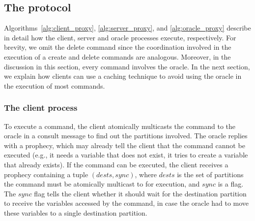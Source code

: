 \subsection{The \dynastar protocol}

Algorithms~\ref{alg:client_proxy}, \ref{alg:server_proxy}, and \ref{alg:oracle_proxy} describe in detail how the client, server and oracle processes execute, respectively. 
For brevity, we omit the delete command since the coordination involved in the execution of a create and delete commands are analogous. 
Moreover, in the discussion in this section, every command involves the oracle.
In the next section, we explain how clients can use a caching technique to avoid using the oracle in the execution of most commands.









\subsubsection{The client process} 

To execute a command, the client atomically multicasts the command to the oracle in a consult message to find out the partitions involved.
The oracle replies with a prophecy, which may already tell the client that the command cannot be executed (e.g., it needs a variable that does not exist, it tries to create a variable that already exists).
If the command can be executed, the client receives a prophecy containing a tuple $(dests, sync)$, where $dests$ is the set of partitions the command must be atomically multicast to for execution, and $sync$ is a flag.
The $sync$ flag tells the client whether it should wait for the destination partition to receive the variables accessed by the command, in case the oracle had to move these variables to a single destination partition.

